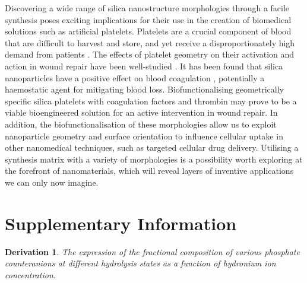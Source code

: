 \documentclass[a4paper,12pt,twocolumn]{article}
\newtheorem{thm}{Derivation} %
\begin{document}
	Discovering a wide range of silica nanostructure morphologies through a facile synthesis poses exciting implications for their use in the creation of biomedical solutions such as artificial platelets. Platelets are a crucial component of blood that are difficult to harvest and store, and yet receive a disproportionately high demand from patients \cite{dolgin2017}. The effects of platelet geometry on their activation and action in wound repair have been well-studied \cite{sakurai2015,kita2011}. It has been found that silica nanoparticles have a positive effect on blood coagulation \cite{gryshchuk2016}, potentially a haemostatic agent for mitigating blood loss. Biofunctionalising geometrically specific silica platelets with coagulation factors and thrombin may prove to be a viable bioengineered solution for an active intervention in wound repair. In addition, the biofunctionalisation of these morphologies allow us to exploit nanoparticle geometry and surface orientation to influence cellular uptake \cite{herd2013} in other nanomedical techniques, such as targeted cellular drug delivery. Utilising a synthesis matrix with a variety of morphologies is a possibility worth exploring at the forefront of nanomaterials, which will reveal layers of inventive applications we can only now imagine.
	
	\raggedbottom 
	\pagebreak
	\onecolumn
	\printbibliography
	
	\pagebreak
	
	\renewcommand{\thefigure}{S\arabic{figure}}

	\setcounter{figure}{0}
	
	\section*{Supplementary Information}

    \begin{thm}The expression of the fractional composition of various phosphate counteranions at different hydrolysis states as a function of hydronium ion concentration.
    \end{thm}
\end{document}
